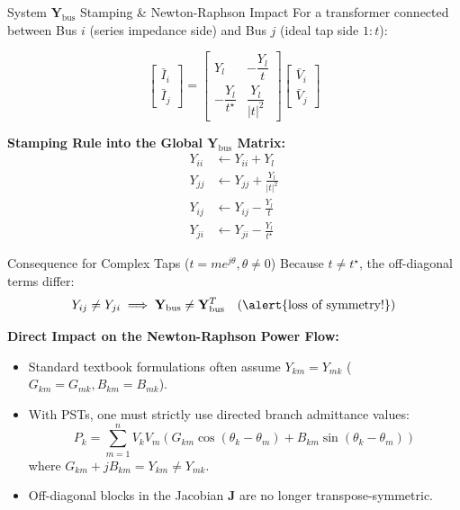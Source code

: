 \begin{frame}[allowframebreaks]{System $\mathbf{Y}_{\text{bus}}$ Stamping \& Newton-Raphson Impact}
For a transformer connected between \alert{Bus $i$} (series impedance side) and \alert{Bus $j$} (ideal tap side $1:t$):

$$\begin{bmatrix} \bar{I}_i \\ \bar{I}_j \end{bmatrix} = 
\begin{bmatrix} 
Y_l & -\dfrac{Y_l}{t} \\ 
-\dfrac{Y_l}{t^\star} & \dfrac{Y_l}{|t|^2} 
\end{bmatrix}
\begin{bmatrix} \bar{V}_i \\ \bar{V}_j \end{bmatrix}$$

\textbf{Stamping Rule into the Global $\mathbf{Y}_{\text{bus}}$ Matrix:}
\begin{align*}
    Y_{ii} &\leftarrow Y_{ii} + Y_l \\
    Y_{jj} &\leftarrow Y_{jj} + \frac{Y_l}{|t|^2} \\
    Y_{ij} &\leftarrow Y_{ij} - \frac{Y_l}{t} \\
    Y_{ji} &\leftarrow Y_{ji} - \frac{Y_l}{t^\star}
\end{align*}

\newpage
\begin{alertblock}{Consequence for Complex Taps ($t = m e^{j\theta}, \theta \ne 0$)}
Because $t \ne t^\star$, the off-diagonal terms differ:
$$Y_{ij} \ne Y_{ji} \implies \mathbf{Y}_{\text{bus}} \ne \mathbf{Y}_{\text{bus}}^T \quad \text{(\alert{loss of symmetry!})}$$
\end{alertblock}

\textbf{Direct Impact on the Newton-Raphson Power Flow:}
\begin{itemize}
    \item Standard textbook formulations often assume $Y_{km} = Y_{mk}$ ($G_{km} = G_{mk}, B_{km} = B_{mk}$).
    \item With PSTs, one \alert{must} strictly use directed branch admittance values:
    $$P_k = \sum_{m=1}^n V_k V_m \left( G_{km} \cos(\theta_k - \theta_m) + B_{km} \sin(\theta_k - \theta_m) \right)$$
    where $G_{km} + j B_{km} = Y_{km} \ne Y_{mk}$.
    \item Off-diagonal blocks in the Jacobian $\mathbf{J}$ are no longer transpose-symmetric.
\end{itemize}
\end{frame}

